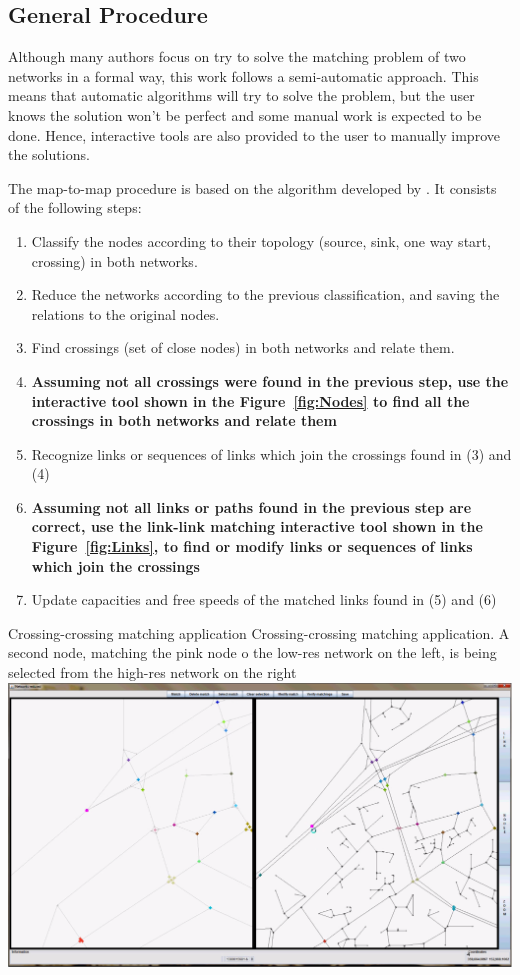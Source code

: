 \subsection{General Procedure}
Although many authors focus on try to solve the matching problem of two networks in a formal way, this work follows a semi-automatic approach. This means that automatic algorithms will try to solve the problem, but the user knows the solution won't be perfect and some manual work is expected to be done. Hence, interactive tools are also provided to the user to manually improve the solutions.

The map-to-map procedure is based on the algorithm developed by \citet{BalmerEtAl_STRC_2005}. It consists of the following steps:
%
\begin{enumerate}
\item Classify the nodes according to their topology (\eg source, sink, one way start, crossing) in both networks.
\item Reduce the networks according to the previous classification, and saving the relations to the original nodes.
\item Find crossings (set of close nodes) in both networks and relate them.
\item \textbf{Assuming not all crossings were found in the previous step, use the interactive tool shown in the Figure~\ref{fig:Nodes} to find all the crossings in both networks and relate them}
\item Recognize links or sequences of links which join the crossings found in (3) and (4)
\item \textbf{Assuming not all links or paths found in the previous step are correct, use the link-link matching interactive tool shown in the Figure~\ref{fig:Links}, to find or modify links or sequences of links which join the crossings}
\item Update capacities and free speeds of the matched links found in (5) and (6)
\end{enumerate}
%
\createfigure
{Crossing-crossing matching application}
{Crossing-crossing matching application. A second node, matching the pink node o the low-res network on the left, is being selected from the high-res network on the right}
{\label{fig:Nodes}}
{\includegraphics[width=1.0\textwidth]{extending/figures/netEdSing/Nodes.png}}
{}

